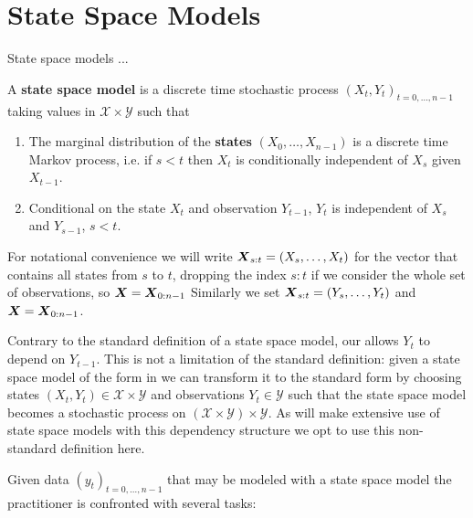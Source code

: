 \chapter{State Space Models}
\label{chapt:ssm}

State space models ...


\begin{definition}
    \label{def:ssm}
    A \textbf{state space model} is a discrete time stochastic process $(X_t, Y_t)_{t=0, \dots, n -1}$ taking values in $\mathcal X \times \mathcal Y$ such that
    \begin{enumerate}
        \item The marginal distribution of the \textbf{states} $(X_0, \dots, X_{n - 1})$ is a discrete time Markov process, i.e. if $s <t$ then $X_t$ is conditionally independent of $X_s$ given $X_{t - 1}$.
        \item Conditional on the state $X_t$ and observation $Y_{t - 1}$, $Y_t$ is independent of $X_s$ and $Y_{s - 1}$, $s < t$.
    \end{enumerate}
\end{definition}

For notational convenience we will write $\boldsymbol{X}_{s:t} = \left(X_s, \dots, X_{t}\right)$ for the vector that contains all states from $s$ to $t$, dropping the index $s:t$ if we consider the whole set of observations, so $\boldsymbol{X} = \boldsymbol{X}_{0:n-1}$ 
Similarly we set $\boldsymbol{X}_{s:t} = \left(Y_s, \dots, Y_{t}\right)$ and $\boldsymbol{X} = \boldsymbol{X}_{0:n-1}$.



\begin{remark}
    Contrary to the standard definition of a state space model, our  allows $Y_t$ to depend on $Y_{t - 1}$.
    This is not a limitation of the standard definition: given a state space model of the form in  we can transform it to the standard form by choosing states $(X_t, Y_t) \in \mathcal X \times \mathcal Y$ and observations $Y_t \in \mathcal Y$ such that the state space model becomes a stochastic process on $ \left( \mathcal X \times \mathcal Y\right) \times \mathcal Y$.
    As  will make extensive use of state space models with this dependency structure we opt to use this non-standard definition here.
\end{remark}

Given data $(y_t)_{t = 0, \dots, n - 1}$ that may be modeled with a state space model the practitioner is confronted with several tasks:

